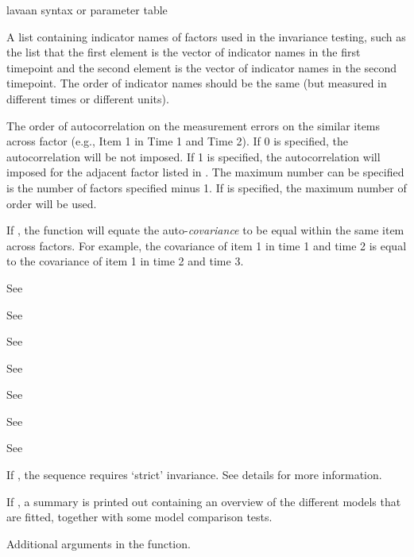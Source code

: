 \documentclass[a4paper]{book}
\begin{document}
\begin{Arguments}
\begin{ldescription}
\item[\code{model}] lavaan syntax or parameter table
\item[\code{varList}] A list containing indicator names of factors used in the invariance testing, such as the list that the first element is the vector of indicator names in the first timepoint and the second element is the vector of indicator names in the second timepoint. The order of indicator names should be the same (but measured in different times or different units).
\item[\code{auto}] The order of autocorrelation on the measurement errors on the similar items across factor (e.g., Item 1 in Time 1 and Time 2). If 0 is specified, the autocorrelation will be not imposed. If 1 is specified, the autocorrelation will imposed for the adjacent factor listed in . The maximum number can be specified is the number of factors specified minus 1. If  is specified, the maximum number of order will be used.
\item[\code{constrainAuto}] If , the function will equate the auto-\emph{covariance} to be equal within the same item across factors. For example, the covariance of item 1 in time 1 and time 2 is equal to the covariance of item 1 in time 2 and time 3.
\item[\code{fixed.x}] See 
\item[\code{std.lv}] See 
\item[\code{group}] See 
\item[\code{group.equal}] See 
\item[\code{group.partial}] See 
\item[\code{warn}] See 
\item[\code{debug}] See 
\item[\code{strict}] If , the sequence requires `strict' invariance. See details for more information.
\item[\code{quiet}] If , a summary is printed out containing an overview of the different models that are fitted, together with some model comparison tests.
\item[\code{...}] Additional arguments in the  function.
\end{ldescription}
\end{Arguments}
\end{document}
